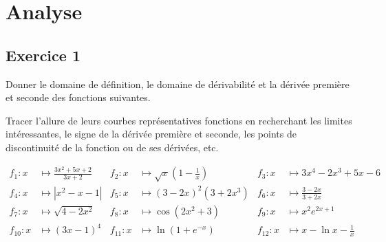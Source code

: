 \chapter{Analyse}


\newcommand{\E}[1]{\cdot 10^{#1}}
\newcommand{\V}[1]{\mathbf{#1}}
\newcommand{\R}{\mathbb{R}}

\newcommand{\etheta}{\boldsymbol{\hat\theta}}
\newcommand{\ephi}{\boldsymbol{\hat\phi}}

\newcommand{\grad}{\boldsymbol{\nabla}}
\newcommand{\dive}{\nabla\cdot}
\newcommand{\curl}{\nabla\times}
\newcommand{\lapl}{\nabla^2}

\newcommand{\pfrac}[3][]{\dfrac{\partial^{#1} #2}{\partial #3^{#1}}}
\newcommand{\ppfrac}[3][]{\pfrac[#1]{}{#3}\left({#2}\right)}
\newcommand{\ffrac}[3][]{\dfrac{\mathrm d^{#1} #2}{\mathrm d#3^{#1}}}
\newcommand{\fffrac}[3][]{\ffrac[#1]{}{#3}\left({#2}\right)}
\newcommand{\lfrac}[2]{\dfrac{D #1}{D #2}}

\newcommand{\meanh}[1]{\langle{#1}\rangle_h}
\newcommand{\Od}[2][]{\mathcal{O}(\Delta #2^{#1})}



\section*{Exercice 1}
Donner le domaine de définition, le domaine de dérivabilité et la
dérivée première et seconde des fonctions suivantes.

Tracer l'allure de leurs courbes représentatives fonctions en recherchant les
limites intéressantes, le signe de la dérivée première et seconde, les
points de discontinuité de la fonction ou de ses dérivées, etc.

\[\begin{aligned}
    f_1\colon x&\mapsto\frac{3x^2+5x+2}{3x+2} &
    f_2\colon x&\mapsto\sqrt{x}\left ( 1-\frac{1}{x}\right )  &
    f_3\colon x&\mapsto3x^4-2x^3+5x-6\\
    f_4\colon x&\mapsto|x^2-x-1| &
    f_5\colon x&\mapsto(3-2x)^2(3+2x^3) &
    f_6\colon x&\mapsto\frac{3-2x}{3+2x}\\
    f_7\colon x&\mapsto\sqrt{4-2x^2} &
    f_8\colon x&\mapsto\cos(2x^2+3) &
    f_9\colon x&\mapsto x^2 e^{2x+1}\\
    f_{10}\colon x&\mapsto\left (3x-1 \right ) ^4 &
    f_{11}\colon x&\mapsto\ln \left ( 1+e^{-x}\right ) &
    f_{12}\colon x&\mapsto x-\ln x-\frac{1}{x}\\
\end{aligned}\]


